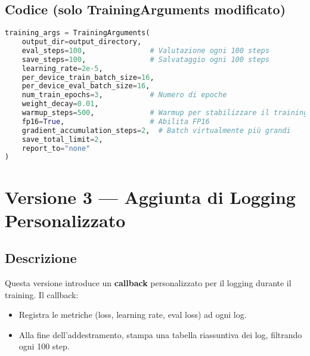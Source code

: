 \documentclass[a4paper,12pt]{article}
\begin{document}
\subsection*{Codice (solo TrainingArguments modificato)}
\begin{lstlisting}[language=Python, caption={Versione 2 --- TrainingArguments modificato}]
training_args = TrainingArguments(
    output_dir=output_directory,
    eval_steps=100,               # Valutazione ogni 100 steps
    save_steps=100,               # Salvataggio ogni 100 steps
    learning_rate=2e-5,
    per_device_train_batch_size=16,
    per_device_eval_batch_size=16,
    num_train_epochs=3,           # Numero di epoche
    weight_decay=0.01,
    warmup_steps=500,             # Warmup per stabilizzare il training
    fp16=True,                    # Abilita FP16
    gradient_accumulation_steps=2,  # Batch virtualmente più grandi
    save_total_limit=2,
    report_to="none"
)
\end{lstlisting}

\section{Versione 3 --- Aggiunta di Logging Personalizzato}
\subsection*{Descrizione}
Questa versione introduce un \textbf{callback} personalizzato per il logging durante il training. Il callback:
\begin{itemize}
    \item Registra le metriche (loss, learning rate, eval loss) ad ogni log.
    \item Alla fine dell'addestramento, stampa una tabella riassuntiva dei log, filtrando ogni 100 step.
\end{itemize}
\end{document}
